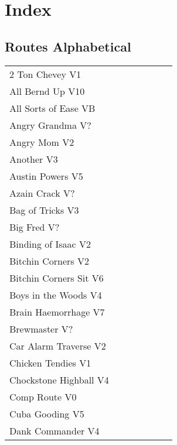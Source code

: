 \chapter{Index}
\lhead{\textcolor{\chapterColor}{\rule[-2pt]{\textwidth}{15pt}}}
\section{Routes Alphabetical}
\begin{center}
\begin{supertabular}{p{0.65\linewidth}r}
2 Ton Chevey V1 & \pageref{rt:2 Ton Chevey} \\
All Bernd Up V10 & \pageref{rt:All Bernd Up} \\
All Sorts of Ease VB & \pageref{rt:All Sorts of Ease} \\
Angry Grandma V? & \pageref{rt:Angry Grandma} \\
Angry Mom V2 & \pageref{rt:Angry Mom} \\
Another V3 & \pageref{rt:Another} \\
Austin Powers V5 & \pageref{rt:Austin Powers} \\
Azain Crack V? & \pageref{rt:Azain Crack} \\
Bag of Tricks V3 & \pageref{vr:Bag of Tricks} \\
Big Fred V? & \pageref{rt:Big Fred} \\
Binding of Isaac V2 & \pageref{rt:Binding of Isaac} \\
Bitchin Corners V2 & \pageref{rt:Bitchin Corners} \\
Bitchin Corners Sit V6 & \pageref{vr:Bitchin Corners Sit} \\
Boys in the Woods V4 & \pageref{rt:Boys in the Woods} \\
Brain Haemorrhage V7 & \pageref{vr:Brain Haemorrhage} \\
Brewmaster V? & \pageref{rt:Brewmaster} \\
Car Alarm Traverse V2 & \pageref{rt:Car Alarm Traverse} \\
Chicken Tendies V1 & \pageref{rt:Chicken Tendies} \\
Chockstone Highball V4 & \pageref{rt:Chockstone Highball} \\
Comp Route V0 & \pageref{rt:Comp Route} \\
Cuba Gooding V5 & \pageref{rt:Cuba Gooding} \\
Dank Commander V4 & \pageref{rt:Dank Commander} \\

\end{supertabular}
\end{center}
